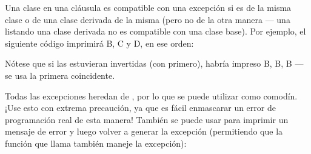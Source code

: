 \documentclass[a4,10pt,spanish]{sphinxmanual}
\begin{document}
\sphinxAtStartPar
Una clase en una cláusula  es compatible con una excepción si es de la misma clase o de una clase derivada de la misma (pero no de la otra manera — una  listando una clase derivada no es compatible con una clase base). Por ejemplo, el siguiente código imprimirá B, C y D, en ese orden:

\begin{sphinxVerbatim}[commandchars=\\\{\}]
 

 

 

   \PYG{p}{[}  \PYG{p}{]}
         
     
     
     
\end{sphinxVerbatim}

\sphinxAtStartPar
Nótese que si las  estuvieran invertidas (con  primero), habría impreso B, B, B — se usa la primera  coincidente.

\sphinxAtStartPar
Todas las excepciones heredan de , por lo que se puede utilizar como comodín. ¡Use esto con extrema precaución, ya que es fácil enmascarar un error de programación real de esta manera! También se puede usar para imprimir un mensaje de error y luego volver a generar la excepción (permitiendo que la función que llama también maneje la excepción):
\end{document}
